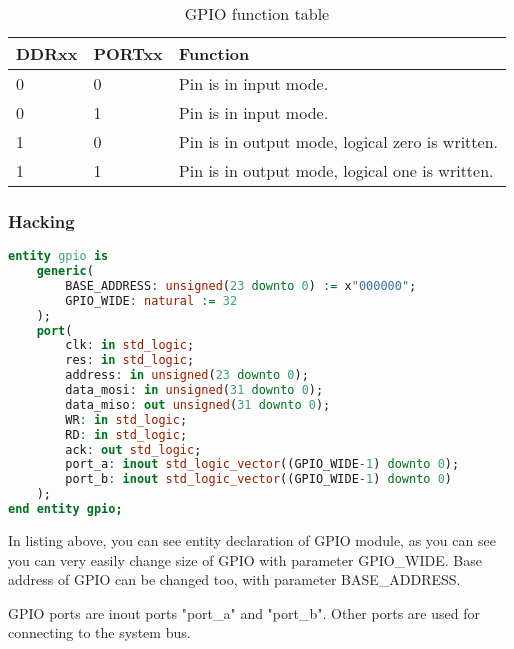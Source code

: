 \begin{table}[h]
    \centering
    \begin{tabular}{|l|l|l|}
        \hline
        \textbf{DDRxx} & \textbf{PORTxx} & \textbf{Function}                               \\ \hline
        0              & 0               & Pin is in input mode.                           \\ \hline
        0              & 1               & Pin is in input mode.                           \\ \hline
        1              & 0               & Pin is in output mode, logical zero is written. \\ \hline
        1              & 1               & Pin is in output mode, logical one is written.  \\ \hline
    \end{tabular}
    \caption{GPIO function table}
    \label{tab:gpio_fuction}
\end{table}

\subsubsection{Hacking}

\begin{lstlisting}[language=VHDL, frame=single]
entity gpio is
    generic(
        BASE_ADDRESS: unsigned(23 downto 0) := x"000000";
        GPIO_WIDE: natural := 32
    );
    port(
        clk: in std_logic;
        res: in std_logic;
        address: in unsigned(23 downto 0);
        data_mosi: in unsigned(31 downto 0);
        data_miso: out unsigned(31 downto 0);
        WR: in std_logic;
        RD: in std_logic;
        ack: out std_logic;
        port_a: inout std_logic_vector((GPIO_WIDE-1) downto 0);
        port_b: inout std_logic_vector((GPIO_WIDE-1) downto 0)
    );
end entity gpio;
\end{lstlisting}

In listing above, you can see entity declaration of GPIO module, as you can see
you can very easily change size of GPIO with parameter GPIO\_WIDE. Base address
of GPIO can be changed too, with parameter BASE\_ADDRESS.

GPIO ports are inout ports "port\_a" and "port\_b". Other ports are used for
connecting to the system bus.

